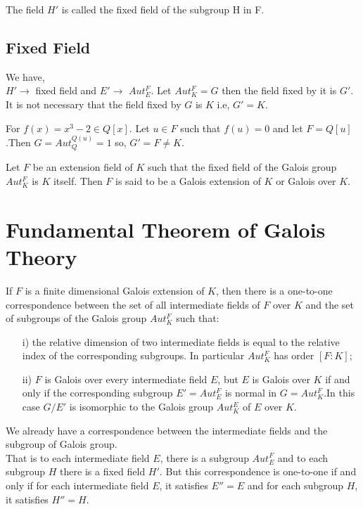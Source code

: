 The field \(H'\) is called the fixed field of the subgroup H in F.

\subsection{Fixed Field}
We have,\\
\(H' \rightarrow\) fixed field and \(E' \rightarrow\) \(Aut_E^F\).\hspace{5mm} Let \(Aut_K^F = G\) then the field fixed by it is \(G'\). It is not necessary that the field fixed by \(G\) is \(K\) i.e, \(G'=K\).
\begin{example}
For \(f(x)=x^3-2 \in Q[x]\). Let \(u \in F\) such that \(f(u)=0\) and let \(F=Q[u]\).Then
\(G=Aut_Q^{Q(u)}={1}\) so, \hspace{5mm}\(G'=F \neq K\).\\
\end{example}

\begin{definition}
  Let \(F\) be an extension field of \(K\) such that the fixed field of the Galois group \(Aut_K^F\) is \(K\) itself. Then \(F\) is said to be a Galois extension of \(K\) or Galois over \( K\).
\end{definition}

\section{Fundamental Theorem of Galois Theory}
\begin{theorem}
If \(F\) is a finite dimensional Galois extension of \(K\), then there is a one-to-one correspondence between the set of all intermediate fields of \(F\) over \(K\) and the set of subgroups of the Galois group \(Aut_K^F\) such that:
\begin{enumerate}
\item[i)] the relative dimension of two intermediate fields is equal to the relative index of the corresponding subgroups. In particular \(Aut_K^F\) has order \([F:K]\);
  \item[ii)] \(F\) is Galois over every intermediate field \(E\), but \(E\) is Galois over \(K\) if and only if the corresponding subgroup \(E'= Aut_E^F\) is normal in \(G=Aut_K^F\).In this case \(G/E'\) is isomorphic to the Galois group \(Aut_K^E\) of \(E\) over \(K\).
  \end{enumerate}
\end{theorem}
We already have a correspondence between the intermediate fields and the subgroup of Galois group.\\
That is to each intermediate field \(E\), there is a subgroup \(Aut_E^F\) and to each subgroup \(H\) there is a fixed field \(H'\). But this correspondence is one-to-one if and only if for each intermediate field \(E\), it satisfies \(E''=E\) and for each subgroup \(H\), it satisfies \(H''=H\).

